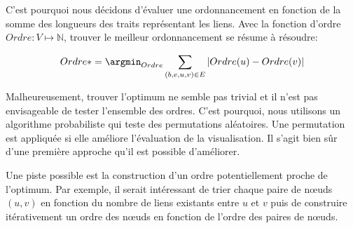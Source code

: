 C'est pourquoi nous décidons d'évaluer une ordonnancement en fonction de la somme des longueurs des traits représentant les liens.
Avec la fonction d'ordre $Ordre: V \longmapsto \mathbb{N}$, trouver le meilleur ordonnancement se résume à résoudre:

\begin{equation}
 Ordre* = \argmin_{Ordre}  \sum_{(b,e,u,v) \in E} |Ordre(u)- Ordre(v)|
\end{equation}

Malheureusement, trouver l'optimum ne semble pas trivial et il n'est pas envisageable de tester l'ensemble des ordres.
C'est pourquoi, nous utilisons un algorithme probabiliste qui teste des permutations aléatoires.
Une permutation est appliquée si elle améliore l'évaluation de la visualisation.
Il s'agit bien sûr d'une première approche qu'il est possible d'améliorer.

Une piste possible est la construction d'un ordre potentiellement proche de l'optimum.
Par exemple, il serait intéressant de trier chaque paire de n\oe uds $(u,v)$ en fonction du nombre de liens existants entre $u$ et $v$ puis de construire itérativement un ordre des n\oe uds en fonction de l'ordre des paires de n\oe uds.